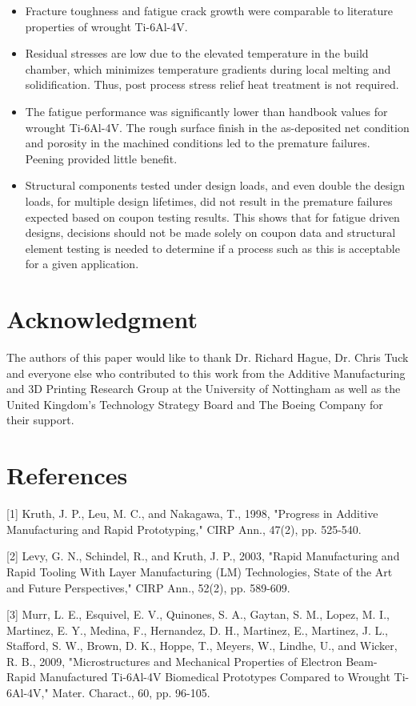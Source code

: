 \documentclass[10pt]{article}
\begin{document}
\begin{itemize}
  \item Fracture toughness and fatigue crack growth were comparable to literature properties of wrought Ti-6Al-4V.
  \item Residual stresses are low due to the elevated temperature in the build chamber, which minimizes temperature gradients during local melting and solidification. Thus, post process stress relief heat treatment is not required.
  \item The fatigue performance was significantly lower than handbook values for wrought Ti-6Al-4V. The rough surface finish in the as-deposited net condition and porosity in the machined conditions led to the premature failures. Peening provided little benefit.
  \item Structural components tested under design loads, and even double the design loads, for multiple design lifetimes, did not result in the premature failures expected based on coupon testing results. This shows that for fatigue driven designs, decisions should not be made solely on coupon data and structural element testing is needed to determine if a process such as this is acceptable for a given application.
\end{itemize}

\section*{Acknowledgment}
The authors of this paper would like to thank Dr. Richard Hague, Dr. Chris Tuck and everyone else who contributed to this work from the Additive Manufacturing and 3D Printing Research Group at the University of Nottingham as well as the United Kingdom's Technology Strategy Board and The Boeing Company for their support.

\section*{References}
[1] Kruth, J. P., Leu, M. C., and Nakagawa, T., 1998, "Progress in Additive Manufacturing and Rapid Prototyping," CIRP Ann., 47(2), pp. 525-540.

[2] Levy, G. N., Schindel, R., and Kruth, J. P., 2003, "Rapid Manufacturing and Rapid Tooling With Layer Manufacturing (LM) Technologies, State of the Art and Future Perspectives," CIRP Ann., 52(2), pp. 589-609.

[3] Murr, L. E., Esquivel, E. V., Quinones, S. A., Gaytan, S. M., Lopez, M. I., Martinez, E. Y., Medina, F., Hernandez, D. H., Martinez, E., Martinez, J. L., Stafford, S. W., Brown, D. K., Hoppe, T., Meyers, W., Lindhe, U., and Wicker, R. B., 2009, "Microstructures and Mechanical Properties of Electron Beam-\\
Rapid Manufactured Ti-6Al-4V Biomedical Prototypes Compared to Wrought Ti-6Al-4V," Mater. Charact., 60, pp. 96-105.
\end{document}
